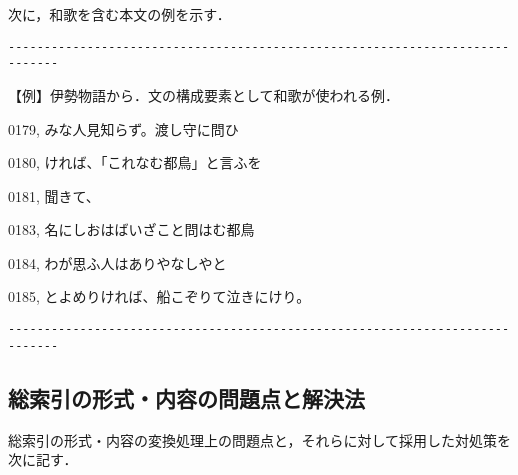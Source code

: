 次に，和歌を含む本文の例を示す．

\vspace{-8pt}\begin{verbatim}
-----------------------------------------------------------------------------
\end{verbatim}\vspace{-8pt}
\noindent
【例】伊勢物語から．文の構成要素として和歌が使われる例．

0179, みな人見知らず。渡し守に問ひ

0180, ければ、「これなむ都鳥」と言ふを

0181, 聞きて、

0183,  名にしおはばいざこと問はむ都鳥

0184, わが思ふ人はありやなしやと　

0185, とよめりければ、船こぞりて泣きにけり。　　

\vspace{-8pt}\begin{verbatim}
-----------------------------------------------------------------------------
\end{verbatim}\vspace{-8pt}
\subsection{総索引の形式・内容の問題点と解決法}
\label{sec:ConcProb}
総索引の形式・内容の変換処理上の問題点と，それらに対して採用した対処策を次に記す．

